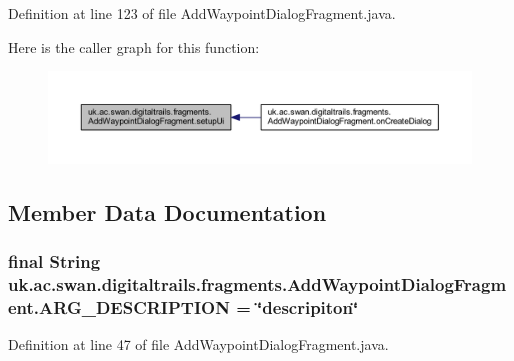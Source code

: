 Definition at line 123 of file Add\+Waypoint\+Dialog\+Fragment.\+java.



Here is the caller graph for this function\+:\nopagebreak
\begin{figure}[H]
\begin{center}
\leavevmode
\includegraphics[width=350pt]{classuk_1_1ac_1_1swan_1_1digitaltrails_1_1fragments_1_1_add_waypoint_dialog_fragment_a179e450eec1d32cbe747364b7148af8e_icgraph}
\end{center}
\end{figure}




\subsection{Member Data Documentation}
\hypertarget{classuk_1_1ac_1_1swan_1_1digitaltrails_1_1fragments_1_1_add_waypoint_dialog_fragment_a9e0a0e2f39659e27adcc2d7877d0bf7a}{
\subsubsection[{A\+R\+G\+\_\+\+D\+E\+S\+C\+R\+I\+P\+T\+I\+O\+N}]{\setlength{\rightskip}{0pt plus 5cm}final String uk.\+ac.\+swan.\+digitaltrails.\+fragments.\+Add\+Waypoint\+Dialog\+Fragment.\+A\+R\+G\+\_\+\+D\+E\+S\+C\+R\+I\+P\+T\+I\+O\+N = \char`\"{}descripiton\char`\"{}\hspace{0.3cm}{\ttfamily [static]}}}\label{classuk_1_1ac_1_1swan_1_1digitaltrails_1_1fragments_1_1_add_waypoint_dialog_fragment_a9e0a0e2f39659e27adcc2d7877d0bf7a}


Definition at line 47 of file Add\+Waypoint\+Dialog\+Fragment.\+java.

